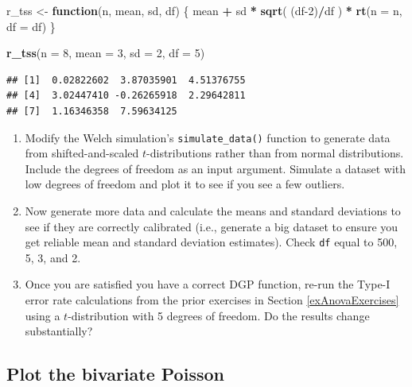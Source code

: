 \documentclass[
]{book}
\newenvironment{Shaded}{\begin{snugshade}}{\end{snugshade}}
\newcommand{\AttributeTok}[1]{\textcolor[rgb]{0.13,0.29,0.53}{#1}}
\newcommand{\ControlFlowTok}[1]{\textcolor[rgb]{0.13,0.29,0.53}{\textbf{#1}}}
\newcommand{\DecValTok}[1]{\textcolor[rgb]{0.00,0.00,0.81}{#1}}
\newcommand{\FunctionTok}[1]{\textcolor[rgb]{0.13,0.29,0.53}{\textbf{#1}}}
\newcommand{\NormalTok}[1]{#1}
\newcommand{\OtherTok}[1]{\textcolor[rgb]{0.56,0.35,0.01}{#1}}
\newcommand{\SpecialCharTok}[1]{\textcolor[rgb]{0.81,0.36,0.00}{\textbf{#1}}}
\begin{document}
\begin{Shaded}
\begin{Highlighting}[]
\NormalTok{r\_tss }\OtherTok{\textless{}{-}} \ControlFlowTok{function}\NormalTok{(n, mean, sd, df) \{}
\NormalTok{  mean }\SpecialCharTok{+}\NormalTok{ sd }\SpecialCharTok{*} \FunctionTok{sqrt}\NormalTok{( (df}\DecValTok{{-}2}\NormalTok{)}\SpecialCharTok{/}\NormalTok{df ) }\SpecialCharTok{*} \FunctionTok{rt}\NormalTok{(}\AttributeTok{n =}\NormalTok{ n, }\AttributeTok{df =}\NormalTok{ df)}
\NormalTok{\}}

\FunctionTok{r\_tss}\NormalTok{(}\AttributeTok{n =} \DecValTok{8}\NormalTok{, }\AttributeTok{mean =} \DecValTok{3}\NormalTok{, }\AttributeTok{sd =} \DecValTok{2}\NormalTok{, }\AttributeTok{df =} \DecValTok{5}\NormalTok{)}
\end{Highlighting}
\end{Shaded}

\begin{verbatim}
## [1]  0.02822602  3.87035901  4.51376755
## [4]  3.02447410 -0.26265918  2.29642811
## [7]  1.16346358  7.59634125
\end{verbatim}

\begin{enumerate}
\def\labelenumi{\arabic{enumi}.}
\item
  Modify the Welch simulation's \texttt{simulate\_data()} function to generate data from shifted-and-scaled \(t\)-distributions rather than from normal distributions. Include the degrees of freedom as an input argument.
  Simulate a dataset with low degrees of freedom and plot it to see if you see a few outliers.
\item
  Now generate more data and calculate the means and standard deviations to see if they are correctly calibrated (i.e., generate a big dataset to ensure you get reliable mean and standard deviation estimates). Check \texttt{df} equal to 500, 5, 3, and 2.
\item
  Once you are satisfied you have a correct DGP function, re-run the Type-I error rate calculations from the prior exercises in Section \ref{exAnovaExercises} using a \(t\)-distribution with 5 degrees of freedom.
  Do the results change substantially?
\end{enumerate}

\subsection{Plot the bivariate Poisson}\label{plot-the-bivariate-poisson}
\end{document}
